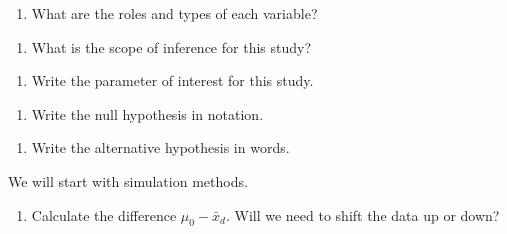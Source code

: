 \documentclass[
]{report}
\providecommand{\tightlist}{%
  \setlength{\itemsep}{0pt}\setlength{\parskip}{0pt}}
\begin{document}
\vspace{0.2in}

\begin{enumerate}
\def\labelenumi{\arabic{enumi}.}
\setcounter{enumi}{2}
\tightlist
\item
  What are the roles and types of each variable?
\end{enumerate}

\vspace{0.3in}

\begin{enumerate}
\def\labelenumi{\arabic{enumi}.}
\setcounter{enumi}{3}
\tightlist
\item
  What is the scope of inference for this study?
\end{enumerate}

\vspace{0.5in}

\begin{enumerate}
\def\labelenumi{\arabic{enumi}.}
\setcounter{enumi}{4}
\tightlist
\item
  Write the parameter of interest for this study.
\end{enumerate}

\vspace{0.8in}

\begin{enumerate}
\def\labelenumi{\arabic{enumi}.}
\setcounter{enumi}{5}
\tightlist
\item
  Write the null hypothesis in notation.
\end{enumerate}

\vspace{0.5in}

\begin{enumerate}
\def\labelenumi{\arabic{enumi}.}
\setcounter{enumi}{6}
\tightlist
\item
  Write the alternative hypothesis in words.
\end{enumerate}

\vspace{0.8in}

We will start with simulation methods.

\begin{enumerate}
\def\labelenumi{\arabic{enumi}.}
\setcounter{enumi}{7}
\tightlist
\item
  Calculate the difference \(\mu_0 - \bar{x}_d\). Will we need to shift the data up or down?
  \vspace{0.5in}
\end{enumerate}
\end{document}

